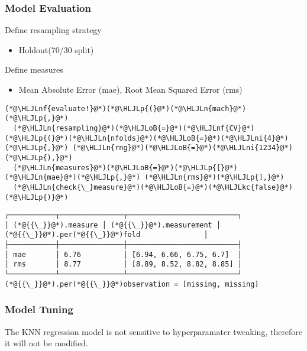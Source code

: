 \documentclass[12pt,a4paper]{article}
\newcommand{\HLJLkc}[1]{\textcolor[RGB]{59,151,46}{\textit{#1}}}
\newcommand{\HLJLn}[1]{#1}
\newcommand{\HLJLnf}[1]{\textcolor[RGB]{66,102,213}{#1}}
\newcommand{\HLJLni}[1]{\textcolor[RGB]{59,151,46}{#1}}
\newcommand{\HLJLoB}[1]{\textcolor[RGB]{102,102,102}{\textbf{#1}}}
\newcommand{\HLJLp}[1]{#1}
\begin{document}
\subsubsection{Model Evaluation}
Define resampling strategy

\begin{itemize}
\item Holdout(70/30 split)

\end{itemize}
Define measures

\begin{itemize}
\item Mean Absolute Error (mae), Root Mean Squared Error (rms)

\end{itemize}

\begin{lstlisting}
(*@\HLJLnf{evaluate!}@*)(*@\HLJLp{(}@*)(*@\HLJLn{mach}@*)(*@\HLJLp{,}@*) 
  (*@\HLJLn{resampling}@*)(*@\HLJLoB{=}@*)(*@\HLJLnf{CV}@*)(*@\HLJLp{(}@*)(*@\HLJLn{nfolds}@*)(*@\HLJLoB{=}@*)(*@\HLJLni{4}@*)(*@\HLJLp{,}@*) (*@\HLJLn{rng}@*)(*@\HLJLoB{=}@*)(*@\HLJLni{1234}@*)(*@\HLJLp{),}@*)
  (*@\HLJLn{measures}@*)(*@\HLJLoB{=}@*)(*@\HLJLp{[}@*)(*@\HLJLn{mae}@*)(*@\HLJLp{,}@*) (*@\HLJLn{rms}@*)(*@\HLJLp{],}@*)  
  (*@\HLJLn{check{\_}measure}@*)(*@\HLJLoB{=}@*)(*@\HLJLkc{false}@*)
(*@\HLJLp{)}@*)
\end{lstlisting}

\begin{lstlisting}
┌───────────┬───────────────┬──────────────────────────┐
│ (*@{{\_}}@*).measure │ (*@{{\_}}@*).measurement │ (*@{{\_}}@*).per(*@{{\_}}@*)fold               │
├───────────┼───────────────┼──────────────────────────┤
│ mae       │ 6.76          │ [6.94, 6.66, 6.75, 6.7]  │
│ rms       │ 8.77          │ [8.89, 8.52, 8.82, 8.85] │
└───────────┴───────────────┴──────────────────────────┘
(*@{{\_}}@*).per(*@{{\_}}@*)observation = [missing, missing]
\end{lstlisting}


\subsubsection{Model Tuning}
The KNN regression model is not sensitive to hyperparamater tweaking, therefore it will not be modified.
\end{document}
